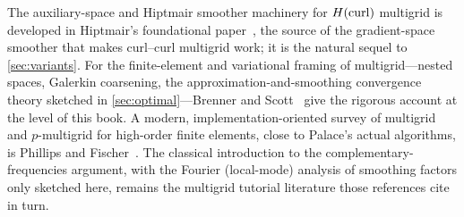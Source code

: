 \furtherreading
The auxiliary-space and Hiptmair smoother machinery for $H(\mathrm{curl})$ multigrid is developed in
Hiptmair's foundational paper~\citep{hiptmair1998}, the source of the gradient-space smoother
that makes curl--curl multigrid work; it is the natural sequel to \cref{sec:variants}. For the
finite-element and variational framing of multigrid---nested spaces, Galerkin coarsening, the
approximation-and-smoothing convergence theory sketched in \cref{sec:optimal}---Brenner and
Scott~\citep{brennerscott2008} give the rigorous account at the level of this book. A modern,
implementation-oriented survey of multigrid and $p$-multigrid for high-order finite elements,
close to Palace's actual algorithms, is Phillips and Fischer~\citep{phillipsfischer2022}. The
classical introduction to the complementary-frequencies argument, with the Fourier (local-mode)
analysis of smoothing factors only sketched here, remains the multigrid tutorial literature
those references cite in turn.

